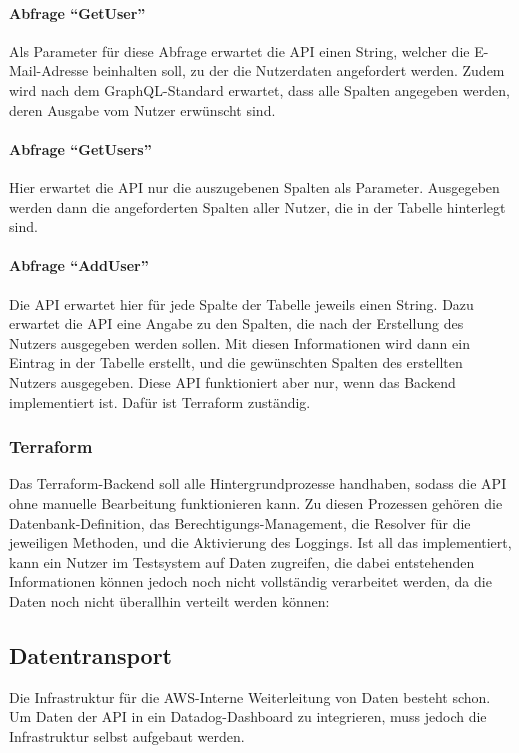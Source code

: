 \paragraph{Abfrage ``GetUser''}
Als Parameter für diese Abfrage erwartet die API einen String, welcher die E-Mail-Adresse beinhalten soll, zu der die Nutzerdaten angefordert werden. Zudem wird nach dem GraphQL-Standard erwartet, dass alle Spalten angegeben werden, deren Ausgabe vom Nutzer erwünscht sind.
\paragraph{Abfrage ``GetUsers''}
Hier erwartet die API nur die auszugebenen Spalten als Parameter. Ausgegeben werden dann die angeforderten Spalten aller Nutzer, die in der Tabelle hinterlegt sind.
\paragraph{Abfrage ``AddUser''}
Die API erwartet hier für jede Spalte der Tabelle jeweils einen String. Dazu erwartet die API eine Angabe zu den Spalten, die nach der Erstellung des Nutzers ausgegeben werden sollen.  Mit diesen Informationen wird dann ein Eintrag in der Tabelle erstellt, und die gewünschten Spalten des erstellten Nutzers ausgegeben.\newline
Diese API funktioniert aber nur, wenn das Backend implementiert ist. Dafür ist Terraform zuständig.
\subsubsection{Terraform}
Das Terraform-Backend soll alle Hintergrundprozesse handhaben, sodass die API ohne manuelle Bearbeitung funktionieren kann. Zu diesen Prozessen gehören die Datenbank-Definition, das Berechtigungs-Management, die Resolver für die jeweiligen Methoden, und die Aktivierung des Loggings. Ist all das implementiert, kann ein Nutzer im Testsystem auf Daten zugreifen, die dabei entstehenden Informationen können jedoch noch nicht vollständig verarbeitet werden, da die Daten noch nicht überallhin verteilt werden können:
\subsection{Datentransport}
Die Infrastruktur für die AWS-Interne Weiterleitung von Daten besteht schon. Um Daten der API in ein Datadog-Dashboard zu integrieren, muss jedoch die Infrastruktur selbst aufgebaut werden.
